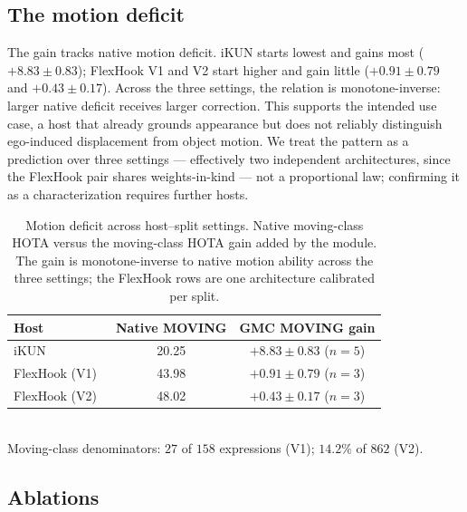 \documentclass[sigconf,anonymous,nonacm]{acmart}
\begin{document}
\subsection{The motion deficit}
\label{sec:deficit}

The gain tracks native motion deficit. iKUN starts lowest and gains most ($+8.83 \pm 0.83$); FlexHook V1 and V2 start higher and gain little ($+0.91 \pm 0.79$ and $+0.43 \pm 0.17$). Across the three settings, the relation is monotone-inverse: larger native deficit receives larger correction. This supports the intended use case, a host that already grounds appearance but does not reliably distinguish ego-induced displacement from object motion. We treat the pattern as a prediction over three settings --- effectively two independent architectures, since the FlexHook pair shares weights-in-kind --- not a proportional law; confirming it as a characterization requires further hosts.

\begin{table}[t]
\centering
\caption{Motion deficit across host--split settings. Native moving-class HOTA versus the moving-class HOTA gain added by the module. The gain is monotone-inverse to native motion ability across the three settings; the FlexHook rows are one architecture calibrated per split.}
\label{tab:deficit}
\small
\begin{tabular}{lcc}
\toprule
Host & Native MOVING & GMC MOVING gain \\
\midrule
iKUN~\cite{ikun}             & 20.25 & $+8.83 \pm 0.83$ ($n{=}5$) \\
FlexHook (V1)~\cite{flexhook}  & 43.98 & $+0.91 \pm 0.79$ ($n{=}3$) \\
FlexHook (V2)~\cite{flexhook}  & 48.02 & $+0.43 \pm 0.17$ ($n{=}3$) \\
\bottomrule
\end{tabular}
\\[2pt]
{\footnotesize Moving-class denominators: $27$ of $158$ expressions (V1); $14.2\%$ of $862$ (V2).}
\end{table}

\subsection{Ablations}
\label{sec:ablation}
\end{document}
